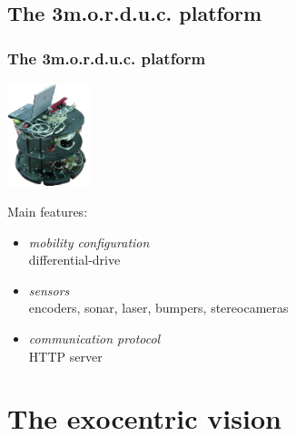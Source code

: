 \documentclass[slidestop,compress,mathserif,note=show, blackandwhite]{beamer}
\begin{document}
\subsection{The 3m.o.r.d.u.c. platform}
\frame
{
  \frametitle{The  3m.o.r.d.u.c. platform}
  
  \begin{center}
    \includegraphics[height=3cm]{img/3morduc.jpg}
  \end{center}
  
  Main features: \\
  \pause

  \begin{itemize}
    
    \item \textit{mobility configuration} \\
      differential-drive
      \pause

    \item \textit{sensors} \\
      encoders, sonar, laser, bumpers, stereocameras
      \pause

    \item \textit{communication protocol} \\
      HTTP server

  \end{itemize}
  
}



\section{The exocentric vision}
\end{document}
